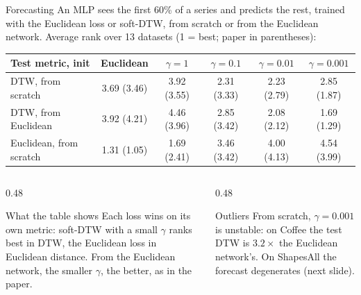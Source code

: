 \documentclass[aspectratio=169,11pt]{beamer}
\begin{document}
\begin{frame}{Forecasting}
An MLP sees the first 60\% of a series and predicts the rest, trained with the Euclidean loss or soft-DTW, from scratch or from the Euclidean network. Average rank over 13 datasets (1 = best; paper in parentheses):
\vspace{0.2cm}
\begin{center}\small
\begin{tabular}{lccccc}
\toprule
Test metric, init & Euclidean & $\gamma=1$ & $\gamma=0.1$ & $\gamma=0.01$ & $\gamma=0.001$\\
\midrule
DTW, from scratch & 3.69 (3.46) & 3.92 (3.55) & 2.31 (3.33) & 2.23 (2.79) & 2.85 (1.87)\\
DTW, from Euclidean & 3.92 (4.21) & 4.46 (3.96) & 2.85 (3.42) & 2.08 (2.12) & 1.69 (1.29)\\
Euclidean, from scratch & 1.31 (1.05) & 1.69 (2.41) & 3.46 (3.42) & 4.00 (4.13) & 4.54 (3.99)\\
\bottomrule
\end{tabular}
\end{center}
\begin{columns}[T]
\begin{column}{0.48\textwidth}
\begin{block}{What the table shows}
Each loss wins on its own metric: soft-DTW with a small $\gamma$ ranks best in DTW, the Euclidean loss in Euclidean distance. From the Euclidean network, the smaller $\gamma$, the better, as in the paper.
\end{block}
\end{column}
\begin{column}{0.48\textwidth}
\begin{block}{Outliers}
From scratch, $\gamma=0.001$ is unstable: on Coffee the test DTW is $3.2\times$ the Euclidean network's. On ShapesAll the forecast degenerates (next slide).
\end{block}
\end{column}
\end{columns}
\end{frame}
\end{document}

